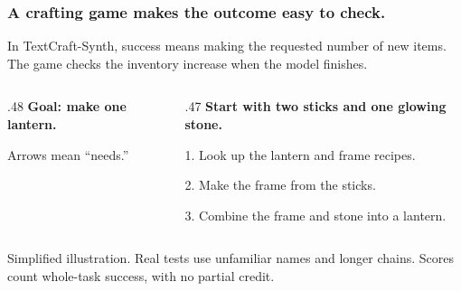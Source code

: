 \documentclass[aspectratio=169,12pt]{beamer}
\newcommand{\aside}[1]{\vfill{\footnotesize\color{Gray}#1\par}}
\begin{document}
\begin{frame}[t]
\frametitle{A crafting game makes the outcome easy to check.}
In TextCraft-Synth, success means making the requested number of new items. The game checks the inventory increase when the model finishes.
\vspace{2mm}
\begin{columns}[T,onlytextwidth]
\begin{column}{.48\textwidth}
\textbf{Goal: make one lantern.}
\begin{center}
\end{center}
{\small Arrows mean ``needs.''}
\end{column}
\begin{column}{.47\textwidth}
\textbf{Start with two sticks and one glowing stone.}
\medskip

1. Look up the lantern and frame recipes.
\medskip

2. Make the frame from the sticks.
\medskip

3. Combine the frame and stone into a lantern.
\end{column}
\end{columns}
\aside{Simplified illustration. Real tests use unfamiliar names and longer chains. Scores count whole-task success, with no partial credit.}
\end{frame}
\end{document}
